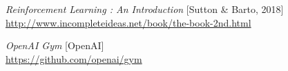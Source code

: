 \begin{thebibliography}{9}
        \textit{Reinforcement Learning : An Introduction} [Sutton \& Barto, 2018]\\
        \url{http://www.incompleteideas.net/book/the-book-2nd.html}
    
        \textit{OpenAI Gym} [OpenAI]\\
        \url{https://github.com/openai/gym}
    \end{thebibliography}
    
    
